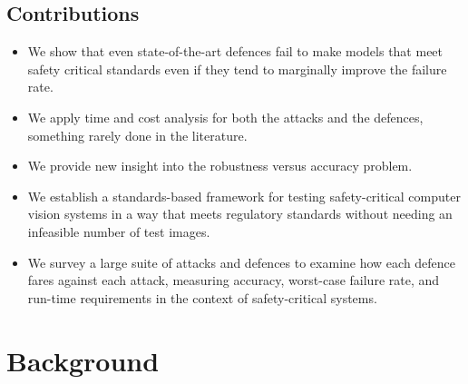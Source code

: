 \documentclass[journal]{IEEEtran}
\begin{document}
\subsection{Contributions}
\begin{itemize}
    \item We show that even state-of-the-art defences fail to make models that meet safety critical standards even if they tend to marginally improve the failure rate.
    \item We apply time and cost analysis for both the attacks and the defences, something rarely done in the literature.
    \item We provide new insight into the robustness versus accuracy problem.
    \item We establish a standards-based framework for testing safety-critical computer vision systems in a way that meets regulatory standards without needing an infeasible number of test images.
    \item We survey a large suite of attacks and defences to examine how each defence fares against each attack, measuring accuracy, worst-case failure rate, and run-time requirements in the context of safety-critical systems.
\end{itemize}


\section{Background}
\end{document}
